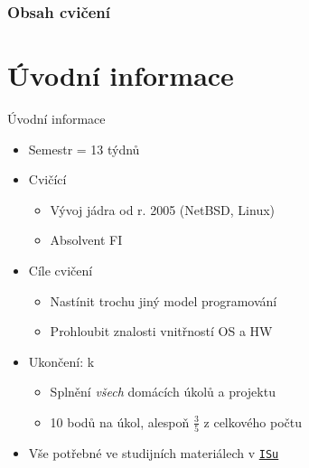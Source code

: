 


\subtitle{I. GIT a jádro}
\date{20. 9. \the\year}



\begin{frame}
  \titlepage
\end{frame}


\begin{frame}
  \frametitle{Obsah cvičení}
  \tableofcontents
\end{frame}

\section{Úvodní informace}
\frame{\sectionpage}

\begin{frame}{Úvodní informace}

  \begin{itemize}
    \item Semestr = 13 týdnů

    \pause

    \item Cvičící
    \begin{itemize}
      \item Vývoj jádra od r. 2005 (NetBSD, Linux)
      \item Absolvent FI
    \end{itemize}

    \pause

    \item Cíle cvičení
    \begin{itemize}
      \item Nastínit trochu jiný model programování
      \item Prohloubit znalosti vnitřností OS a HW
    \end{itemize}

    \pause

    \item Ukončení: k
    \begin{itemize}
      \item Splnění \emph{všech} domácích úkolů a projektu
      \item 10 bodů na úkol, alespoň $\frac{3}{5}$ z celkového počtu
    \end{itemize}

    \pause

    \item Vše potřebné ve studijních materiálech v \href{https://is.muni.cz/auth/el/1433/podzim2016/PB173/index.qwarp}{\nolinkurl{ISu}}

  \end{itemize}

\end{frame}

